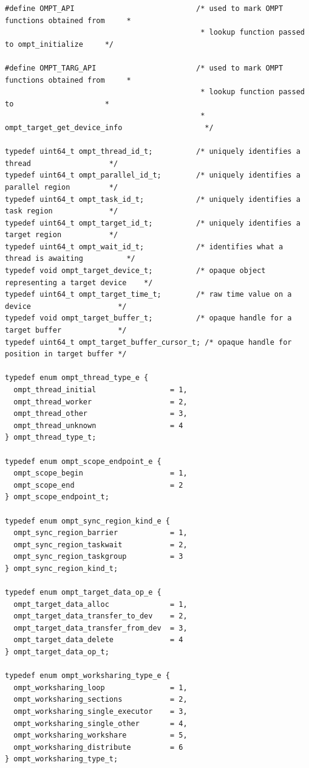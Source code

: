 \documentclass{article}
\begin{document}
\begin{verbatim}
#define OMPT_API                            /* used to mark OMPT functions obtained from     *
                                             * lookup function passed to ompt_initialize     */ 
                                             
#define OMPT_TARG_API                       /* used to mark OMPT functions obtained from     *
                                             * lookup function passed to                     *
                                             * ompt_target_get_device_info                   */
                                             
typedef uint64_t ompt_thread_id_t;          /* uniquely identifies a thread                  */ 
typedef uint64_t ompt_parallel_id_t;        /* uniquely identifies a parallel region         */
typedef uint64_t ompt_task_id_t;            /* uniquely identifies a task region             */
typedef uint64_t ompt_target_id_t;          /* uniquely identifies a target region           */
typedef uint64_t ompt_wait_id_t;            /* identifies what a thread is awaiting          */
typedef void ompt_target_device_t;          /* opaque object representing a target device    */
typedef uint64_t ompt_target_time_t;        /* raw time value on a device                    */
typedef void ompt_target_buffer_t;          /* opaque handle for a target buffer             */ 
typedef uint64_t ompt_target_buffer_cursor_t; /* opaque handle for position in target buffer */

typedef enum ompt_thread_type_e {
  ompt_thread_initial                 = 1,
  ompt_thread_worker                  = 2,
  ompt_thread_other                   = 3,
  ompt_thread_unknown                 = 4
} ompt_thread_type_t;

typedef enum ompt_scope_endpoint_e {
  ompt_scope_begin                    = 1,
  ompt_scope_end                      = 2
} ompt_scope_endpoint_t;

typedef enum ompt_sync_region_kind_e {
  ompt_sync_region_barrier            = 1, 
  ompt_sync_region_taskwait           = 2,
  ompt_sync_region_taskgroup          = 3
} ompt_sync_region_kind_t;

typedef enum ompt_target_data_op_e {
  ompt_target_data_alloc              = 1,
  ompt_target_data_transfer_to_dev    = 2,
  ompt_target_data_transfer_from_dev  = 3,
  ompt_target_data_delete             = 4
} ompt_target_data_op_t;

typedef enum ompt_worksharing_type_e {
  ompt_worksharing_loop               = 1, 
  ompt_worksharing_sections           = 2,
  ompt_worksharing_single_executor    = 3,
  ompt_worksharing_single_other       = 4,
  ompt_worksharing_workshare          = 5,
  ompt_worksharing_distribute         = 6
} ompt_worksharing_type_t;


\end{verbatim}
\end{document}
